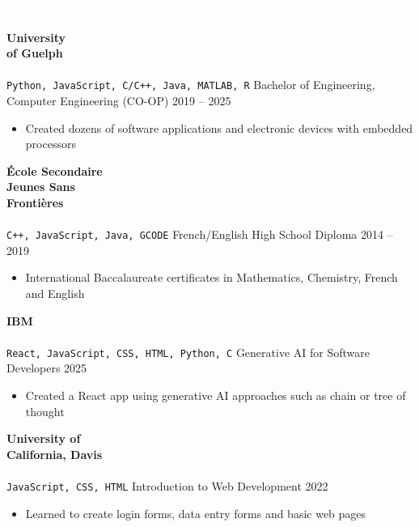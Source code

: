 \documentclass[9pt]{src/developercv} %
\begin{document}
	\colorbox{sky800}{\textcolor{white}{\LARGE\MakeUppercase{\textbf{Education and Certifications}}}}\\%
	\begin{entrylist}
		\entry
			{\textbf{University\\of Guelph}\\\\\small{\texttt{Python, JavaScript, C/C++, Java, MATLAB, R}}\hfill}
			{Bachelor of Engineering, Computer Engineering (CO-OP)}
			{2019 -- 2025}
			{
				\vspace{-1.0\baselineskip}
				\begin{itemize}
					\item Created dozens of software applications and electronic devices with embedded processors
				\end{itemize}
			}
		\entry
			{\textbf{École Secondaire\\Jeunes Sans\\Frontières}\\\\\small{\texttt{C++, JavaScript, Java, GCODE}}\hfill}
			{French/English High School Diploma}
			{2014 -- 2019}
			{
				\vspace{-1.0\baselineskip}
				\begin{itemize}
					\item International Baccalaureate certificates in Mathematics, Chemistry, French and English
				\end{itemize}
			}
		\entry
			{\textbf{IBM}\\\\\small{\texttt{React, JavaScript, CSS, HTML, Python, C}}\hfill}
			{Generative AI for Software Developers}
			{2025}
			{
				\vspace{-1.0\baselineskip}
				\begin{itemize}
					\item Created a React app using generative AI approaches such as chain or tree of thought
				\end{itemize}
			}
			
		\entry
			{\textbf{University of\\California, Davis}\\\\\small{\texttt{JavaScript, CSS, HTML}}\hfill}
			{Introduction to Web Development}
			{2022}
			{
				\vspace{-1.0\baselineskip}
				\begin{itemize}
					\item Learned to create login forms, data entry forms and basic web pages
				\end{itemize}
			}
	\end{entrylist}
\end{document}
